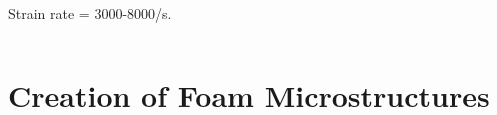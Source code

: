 \documentclass{beamer}
\begin{document}
\begin{frame}
\begin{columns}[c]
        \begin{column}{5cm}
          \centering
           \\
          {\scriptsize Strain rate = 3000-8000/s.}
        \end{column}
      \end{columns}
    \end{frame}

  \section{Creation of Foam Microstructures}
\end{document}
